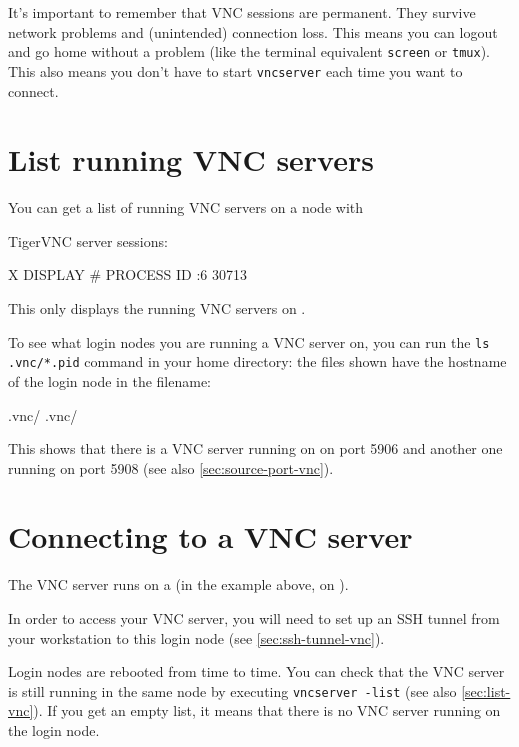 It's important to remember that VNC sessions are permanent. They survive network
problems and (unintended) connection loss. This means you can logout and go home
without a problem (like the terminal equivalent \lstinline|screen| or \lstinline|tmux|).
This also means you don't have to start \lstinline|vncserver| each time you want to connect.

\section{List running VNC servers}
\label{sec:list-vnc}

You can get a list of running VNC servers on a node with

\begin{prompt}
TigerVNC server sessions:

X DISPLAY #	PROCESS ID
:6		    30713
\end{prompt}

This only displays the running VNC servers on .

To see what login nodes you are running a VNC server on, you can run the \lstinline|ls .vnc/*.pid|
command in your home directory: the files shown have the hostname of the login node in the filename:

\begin{prompt}
.vnc/%
.vnc/%
\end{prompt}

This shows that there is a VNC server running on \texttt{\loginhost{}} on port 5906
and another one running \texttt{\altloginhost{}} on port 5908 (see also \autoref{sec:source-port-vnc}).

\section{Connecting to a VNC server}

The VNC server runs on a  (in the example above, on \texttt{\loginhost{}}).

In order to access your VNC server, you will need to set up an SSH tunnel from your workstation
to this login node (see \autoref{sec:ssh-tunnel-vnc}).

Login nodes are rebooted from time to time. You can check that the VNC server is still
running in the same node by executing \lstinline|vncserver -list| (see also \autoref{sec:list-vnc}).
If you get an empty list, it means that there is no VNC server running on the login node.

